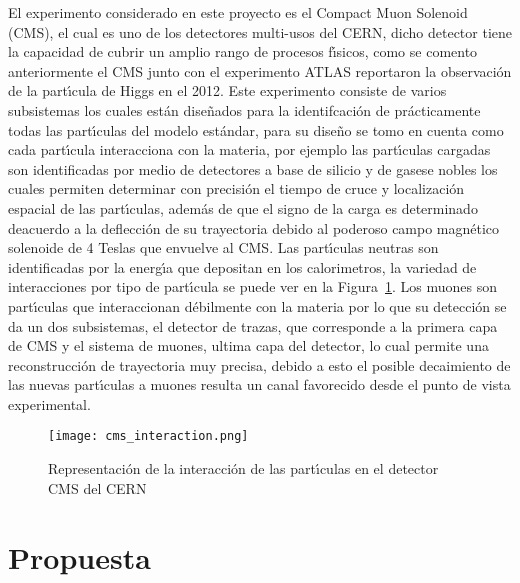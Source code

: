 El experimento considerado en este proyecto es el Compact Muon Solenoid (CMS), el cual es uno de los detectores multi-usos del CERN, dicho detector tiene la capacidad de cubrir un amplio rango de procesos f\'{\i}sicos, como se comento anteriormente el CMS junto con el experimento ATLAS reportaron la observaci\'on de la part\'{\i}cula de Higgs en el 2012.  Este experimento consiste de varios subsistemas los cuales est\'an dise\~nados para la identifcaci\'on de pr\'acticamente todas las part\'{\i}culas del modelo est\'andar, para su dise\~no se tomo en cuenta como cada part\'{\i}cula interacciona con la materia, por ejemplo las part\'{\i}culas cargadas son identificadas por medio de detectores a base de silicio y de gasese nobles los cuales permiten determinar con precisi\'on el tiempo de cruce y localizaci\'on espacial de las part\'{\i}culas, adem\'as de que el signo de la carga es determinado deacuerdo a la deflecci\'on de su trayectoria debido al poderoso campo magn\'etico solenoide de 4 Teslas que envuelve al CMS.  Las part\'{\i}culas neutras son identificadas por la energ\'{\i}a que depositan en los calorimetros, la variedad de interacciones por tipo de part\'{\i}cula se puede ver en la Figura~\ref{fig:cms_interaction}. Los muones son part\'{\i}culas que interaccionan d\'ebilmente con la materia por lo que su detecci\'on se da un dos subsistemas, el detector de trazas, que corresponde a la primera capa de CMS y el sistema de muones, ultima capa del detector, lo cual permite una reconstrucci\'on de trayectoria muy precisa, debido a esto el posible decaimiento de las nuevas part\'{\i}culas a muones resulta un canal favorecido desde el punto de vista experimental.


\begin{figure}
\begin{center}
 \texttt{[image: cms\_interaction.png]}
  \caption{Representaci\'on de la interacci\'on de las part\'{\i}culas en el detector CMS del CERN}
 \label{fig:cms_interaction}
 \end{center}
\end{figure}

\chapter{Propuesta}

